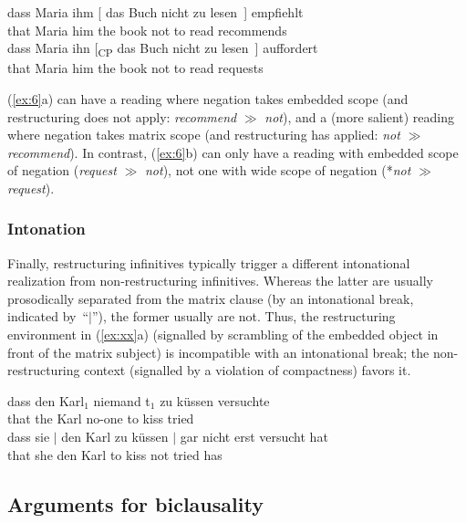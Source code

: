 \documentclass[output=paper]{langsci/langscibook}
\begin{document}
\ea\label{ex:6} 
\ea \gll dass \label{negw3}Maria ihm [ das Buch nicht zu lesen~] empfiehlt\\
that Maria\textsubscript{\Nom} him\textsubscript{\Dat} {} the book\textsubscript{\Acc} not to read recommends\\
\ex \gll dass Maria ihn [\textsubscript{CP} das Buch nicht zu lesen~]  auffordert\\
that Maria\textsubscript{\Nom} him\textsubscript{\Acc} {} the book\textsubscript{\Acc} not to read requests\\
\z
\z

(\ref{ex:6}a) can have a reading where negation takes embedded scope
(and restructuring does not apply: {\itshape recommend} $\gg$ {\itshape not}), and a
(more salient) reading where negation takes matrix scope (and restructuring
has applied: {\itshape not} $\gg$ {\itshape recommend}). In contrast, (\ref{ex:6}b) can only have a
reading with embedded scope of negation ({\itshape request} $\gg$ {\it
  not}), not one with wide scope of negation (*{\itshape not} $\gg$ {\it
  request}).


\subsubsection{\label{m7}Intonation}

Finally, restructuring infinitives typically trigger a different intonational
realization from non-restructuring infinitives. Whereas the latter are usually
prosodically separated from the matrix clause (by an intonational break,
indicated by~``$|$''), the former usually are not. Thus, the restructuring
environment in (\ref{ex:xx}a) (signalled by scrambling of the embedded object
in front of the matrix subject) is incompatible with an intonational break; the
non-restructuring context (signalled by a violation of compactness) favors it.

\ea\label{ex:xx} 
    \ea \gll dass den Karl$_1$  niemand t$_1$ zu küssen versuchte\\
    that the Karl\textsubscript{\Acc} no-one\textsubscript{\Nom} {}  to kiss tried\\
    \ex \gll dass sie $|$ den Karl zu küssen $|$  gar nicht erst versucht hat\\
    that she\textsubscript{\Nom} {} den Karl\textsubscript{\Acc} to kiss {} \Ptcl{} not \Ptcl{} tried has\\
    \z
\z

\subsection{Arguments for biclausality}
\end{document}
